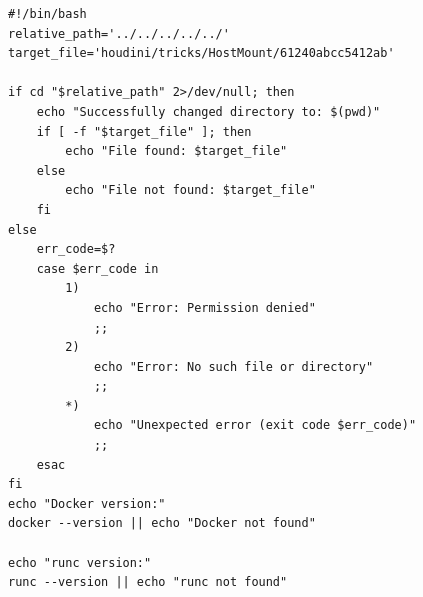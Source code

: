 \begin{listing}[h!]
\caption{Trick Implementation for Case Study I}
\label{lst:pythoncase1}
\begin{verbatim}
#!/bin/bash
relative_path='../../../../../'
target_file='houdini/tricks/HostMount/61240abcc5412ab'

if cd "$relative_path" 2>/dev/null; then
    echo "Successfully changed directory to: $(pwd)"
    if [ -f "$target_file" ]; then
        echo "File found: $target_file"
    else
        echo "File not found: $target_file"
    fi
else
    err_code=$?
    case $err_code in
        1)
            echo "Error: Permission denied"
            ;;
        2)
            echo "Error: No such file or directory"
            ;;
        *)
            echo "Unexpected error (exit code $err_code)"
            ;;
    esac
fi
echo "Docker version:"
docker --version || echo "Docker not found"

echo "runc version:"
runc --version || echo "runc not found"
\end{verbatim}
\end{listing}

